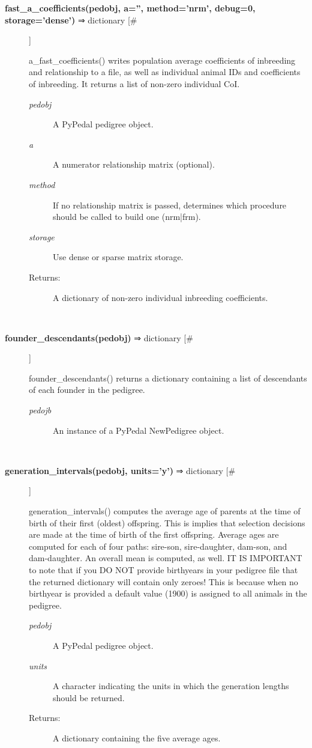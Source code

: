 \begin{description}
\item[\textbf{fast\_a\_coefficients(pedobj, a='', method='nrm', debug=0, storage='dense')} ⇒ dictionary [\#]
]
\par a\_fast\_coefficients() writes population average coefficients of inbreeding and
relationship to a file, as well as individual animal IDs and coefficients of
inbreeding.  It returns a list of non-zero individual CoI.
\begin{description}
\item[\textit{pedobj}
]
A PyPedal pedigree object.
\item[\textit{a}
]
A numerator relationship matrix (optional).
\item[\textit{method}
]
If no relationship matrix is passed, determines which procedure should be called to build one (nrm|frm).
\item[\textit{storage}
]
Use dense or sparse matrix storage.
\item[Returns:
]
A dictionary of non-zero individual inbreeding coefficients.
\end{description}\\

\item[\textbf{founder\_descendants(pedobj)} ⇒ dictionary [\#]
]
\par founder\_descendants() returns a dictionary containing a list of descendants of
each founder in the pedigree.
\begin{description}
\item[\textit{pedojb}
]
An instance of a PyPedal NewPedigree object.
\end{description}\\

\item[\textbf{generation\_intervals(pedobj, units='y')} ⇒ dictionary [\#]
]
\par generation\_intervals() computes the average age of parents at the time of
birth of their first (oldest) offspring.  This is implies that selection
decisions are made at the time of birth of the first offspring.  Average
ages are computed for each of four paths: sire-son, sire-daughter, dam-son,
and dam-daughter.  An overall mean is computed, as well.  IT IS IMPORTANT
to note that if you DO NOT provide birthyears in your pedigree file that the
returned dictionary will contain only zeroes!  This is because when no birthyear
is provided a default value (1900) is assigned to all animals in the pedigree.
\begin{description}
\item[\textit{pedobj}
]
A PyPedal pedigree object.
\item[\textit{units}
]
A character indicating the units in which the generation lengths should be returned.
\item[Returns:
]
A dictionary containing the five average ages.
\end{description}\\


\end{description}
